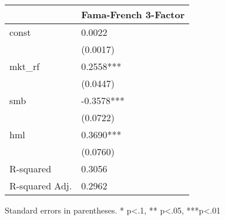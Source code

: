 \begin{table}
\caption{}
\label{}
\begin{center}
\begin{tabular}{ll}
\hline
               & Fama-French 3-Factor  \\
\hline
const          & 0.0022                \\
               & (0.0017)              \\
mkt\_rf        & 0.2558***             \\
               & (0.0447)              \\
smb            & -0.3578***            \\
               & (0.0722)              \\
hml            & 0.3690***             \\
               & (0.0760)              \\
R-squared      & 0.3056                \\
R-squared Adj. & 0.2962                \\
\hline
\end{tabular}
\end{center}
\end{table}
\bigskip
Standard errors in parentheses. \newline 
* p<.1, ** p<.05, ***p<.01
